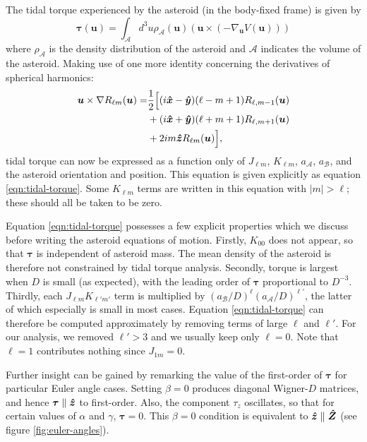 The tidal torque experienced by the asteroid (in the body-fixed frame) is given by
\begin{equation}
  \bm{\tau}(\bm u) = \int_\mathcal{A} d^3 u \rho_\mathcal{A}(\bm u) (\bm u \times (-\nabla_{\bm u} V(\bm u)))
\end{equation}
where $\rho_\mathcal{A}$ is the density distribution of the asteroid and $\mathcal{A}$ indicates the volume of the asteroid. Making use of one more identity concerning the derivatives of spherical harmonics:
\begin{equation}
  \begin{split}
  \bm u \times \nabla R_{\ell m}(\bm u)=&\frac{1}{2}\Big[(i\bm{\hat{x}} - \bm{\hat{y}})(\ell-m+1)R_{\ell,m-1}(\bm u)\\
  &+(i\bm{\hat{x}}+\bm{\hat{y}})(\ell+m+1)R_{\ell,m+1}(\bm u)\\
  & +2im\bm{\hat{z}} R_{\ell m}(\bm u)\Big],
  \end{split}
\end{equation}
tidal torque can now be expressed as a function only of $J_{\ell m}$, $K_{\ell m}$, $a_\mathcal{A}$, $a_\mathcal{B}$, and the asteroid orientation and position. This equation is given explicitly as equation \ref{eqn:tidal-torque}. Some $K_{\ell m}$ terms are written in this equation with $|m|>\ell$; these should all be taken to be zero.

Equation \ref{eqn:tidal-torque} possesses a few explicit properties which we discuss before writing the asteroid equations of motion. Firstly, $K_{00}$ does not appear, so that $\bm \tau$ is independent of asteroid mass. The mean density of the asteroid is therefore not constrained by tidal torque analysis. Secondly, torque is largest when $D$ is small (as expected), with the leading order of $\bm \tau$ proportional to $D^{-3}$. Thirdly, each $J_{\ell m}K_{\ell' m'}$ term is multiplied by $(a_\mathcal{B}/D)^\ell (a_\mathcal{A}/D)^{\ell'}$, the latter of which especially is small in most cases. Equation \ref{eqn:tidal-torque} can therefore be computed approximately by removing terms of large $\ell$ and $\ell'$. For our analysis, we removed $\ell' > 3$ and we usually keep only $\ell=0$. Note that $\ell=1$ contributes nothing since $J_{1m}=0$.

Further insight can be gained by remarking the value of the first-order of $\bm \tau$ for particular Euler angle cases. Setting $\beta = 0$ produces diagonal Wigner-$D$ matrices, and hence $\bm \tau \parallel \bm{\hat{z}}$ to first-order. Also, the component $\tau_z$ oscillates, so that for certain values of $\alpha$ and $\gamma$, $\bm \tau = 0.$ This $\beta=0$ condition is equivalent to $\bm{\hat{z}} \parallel \bm{\hat{Z}}$ (see figure \ref{fig:euler-angles}).

